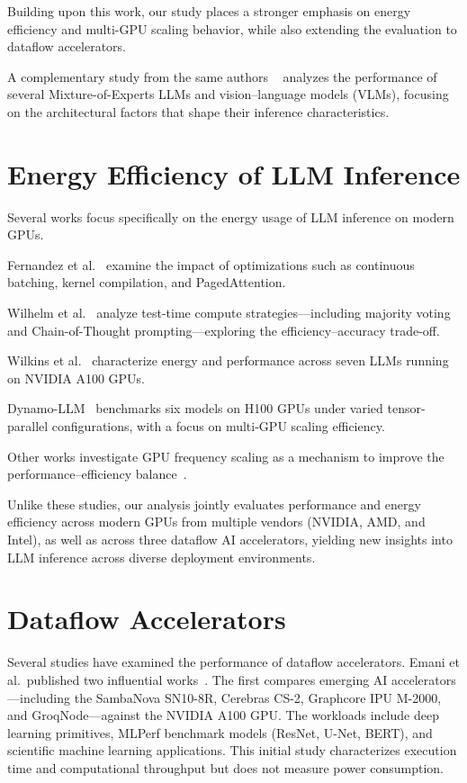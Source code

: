 Building upon this work, our study places a stronger emphasis on energy efficiency and multi-GPU scaling behavior, while also extending the evaluation to dataflow accelerators.

A complementary study from the same authors ~\cite{chitty2025moe} analyzes the performance of several Mixture-of-Experts LLMs and vision–language models (VLMs), focusing on the architectural factors that shape their inference characteristics.


\section{Energy Efficiency of LLM Inference}

Several works focus specifically on the energy usage of LLM inference on modern GPUs.  

Fernandez et al.~\cite{fernandez2025energy} examine the impact of optimizations such as continuous batching, kernel compilation, and PagedAttention.  

Wilhelm et al.~\cite{wilhelm2025beyond} analyze test-time compute strategies—including majority voting and Chain-of-Thought prompting—exploring the efficiency–accuracy trade-off.  

Wilkins et al.~\cite{wilkins2024offline} characterize energy and performance across seven LLMs running on NVIDIA A100 GPUs.  

Dynamo-LLM~\cite{stojkovic2025dynamollm} benchmarks six models on H100 GPUs under varied tensor-parallel configurations, with a focus on multi-GPU scaling efficiency.  

Other works investigate GPU frequency scaling as a mechanism to improve the performance–efficiency balance~\cite{maliakel2025investigating, kakolyris2024slo, stojkovic2024towards}.

Unlike these studies, our analysis jointly evaluates performance and energy efficiency across modern GPUs from multiple vendors (NVIDIA, AMD, and Intel), as well as across three dataflow AI accelerators, yielding new insights into LLM inference across diverse deployment environments.

\section{Dataflow Accelerators}

Several studies have examined the performance of dataflow accelerators.  
Emani et al.\ published two influential works~\cite{Emani2021, Emani2022}.  
The first compares emerging AI accelerators—including the SambaNova SN10-8R, Cerebras CS-2, Graphcore IPU M-2000, and GroqNode—against the NVIDIA A100 GPU. The workloads include deep learning primitives, MLPerf benchmark models (ResNet, U-Net, BERT), and scientific machine learning applications. This initial study characterizes execution time and computational throughput but does not measure power consumption.


